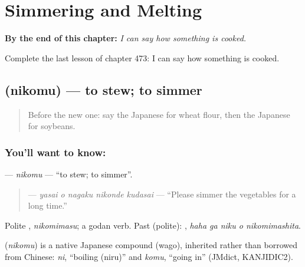 
\chapter{Simmering and Melting}
\label{ch:ja-simmering-and-melting}

\begin{chapteropening}
\textbf{By the end of this chapter:} \emph{I can say how something is cooked.}

Complete the last lesson of chapter 473: I can say how something is cooked.
\end{chapteropening}

\section[\texorpdfstring{\ja{にこむ} (nikomu)}{にこむ (nikomu)}]{ (nikomu) — to stew; to simmer}

\label{lesson:JA-C473-nikomu}



\begin{quote}
Before the new one: say the Japanese for wheat flour, then the Japanese for soybeans.
\end{quote}

\subsection*{You'll want to know: }
\textbf{} — \emph{nikomu} — \textquotedblleft{}to stew; to simmer\textquotedblright{}.

\begin{quote}
\textbf{   } — \emph{yasai o nagaku nikonde kudasai} — \textquotedblleft{}Please simmer the vegetables for a long time.\textquotedblright{}
\end{quote}

Polite \textbf{}, \emph{nikomimasu}; a godan verb. Past (polite): \textbf{  }, \emph{haha ga niku o nikomimashita}.

\begin{cousinweb}
\textbf{} (\emph{nikomu}) is a native Japanese compound (wago), inherited rather than borrowed from Chinese: \emph{ni}, \textquotedblleft{}boiling (niru)\textquotedblright{} and \emph{komu}, \textquotedblleft{}going in\textquotedblright{} (JMdict, KANJIDIC2).
\end{cousinweb}

